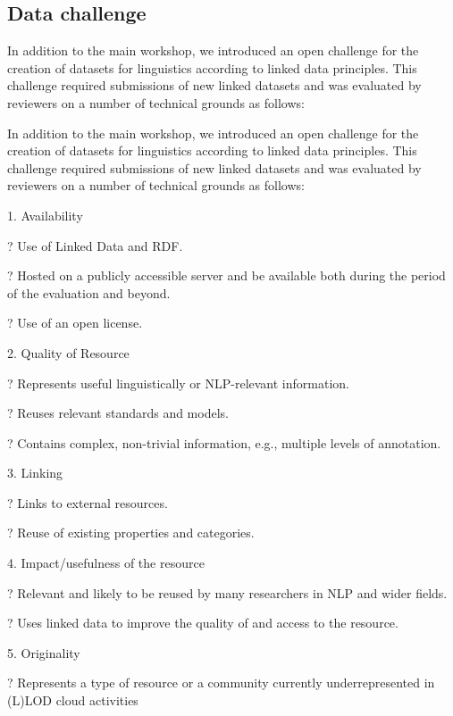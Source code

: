 \subsection{Data challenge}

In addition to the main workshop, we introduced an open challenge for the creation of datasets for linguistics according to linked data principles. This challenge required submissions of new linked datasets and was evaluated by reviewers on a number of technical grounds as follows: 

\baselineskip=13pt
In addition to the main workshop, we introduced an open challenge for the creation 
of datasets for linguistics according to linked data principles. This challenge 
required submissions of new linked datasets and was evaluated by reviewers on a 
number of technical grounds as follows: 

\vspace{13pt}
\leftskip=36pt
\parindent=-18pt
{\large{}1. }Availability

\leftskip=72pt
{\large{}? }Use of Linked Data and RDF.

{\large{}? }Hosted on a publicly accessible server and be available both during 
the period of the evaluation and beyond.

{\large{}? }Use of an open license.

\leftskip=36pt
{\large{}2. }Quality of Resource

\leftskip=72pt
{\large{}? }Represents useful linguistically or NLP-relevant information.

{\large{}? }Reuses relevant standards and models.

{\large{}? }Contains complex, non-trivial information, e.g., multiple levels 
of annotation.

\leftskip=36pt
{\large{}3. }Linking

\leftskip=72pt
{\large{}? }Links to external resources.

{\large{}? }Reuse of existing properties and categories.

\leftskip=36pt
{\large{}4. }Impact/usefulness of the resource

\leftskip=72pt
{\large{}? }Relevant and likely to be reused by many researchers in NLP and wider 
fields.

{\large{}? }Uses linked data to improve the quality of and access to the resource.

\leftskip=36pt
{\large{}5. }Originality

\leftskip=72pt
{\large{}? }Represents a type of resource or a community currently underrepresented 
in (L)LOD cloud activities


